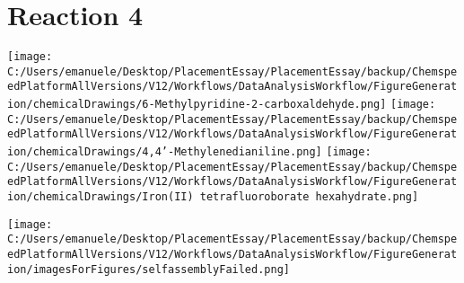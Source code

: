 \documentclass{article}%
\begin{document}
\section*{Reaction 4}%
%
\begin{scheme}[H]%
\begin{minipage}{0.5\textwidth}%
\texttt{[image: C:/Users/emanuele/Desktop/PlacementEssay/PlacementEssay/backup/ChemspeedPlatformAllVersions/V12/Workflows/DataAnalysisWorkflow/FigureGeneration/chemicalDrawings/6-Methylpyridine-2-carboxaldehyde.png]}%
\texttt{[image: C:/Users/emanuele/Desktop/PlacementEssay/PlacementEssay/backup/ChemspeedPlatformAllVersions/V12/Workflows/DataAnalysisWorkflow/FigureGeneration/chemicalDrawings/4,4'-Methylenedianiline.png]}%
\texttt{[image: C:/Users/emanuele/Desktop/PlacementEssay/PlacementEssay/backup/ChemspeedPlatformAllVersions/V12/Workflows/DataAnalysisWorkflow/FigureGeneration/chemicalDrawings/Iron(II) tetrafluoroborate hexahydrate.png]}%
\end{minipage}%
\begin{minipage}{0.5\textwidth}%
\begin{center}%
\texttt{[image: C:/Users/emanuele/Desktop/PlacementEssay/PlacementEssay/backup/ChemspeedPlatformAllVersions/V12/Workflows/DataAnalysisWorkflow/FigureGeneration/imagesForFigures/selfassemblyFailed.png]}%
\end{center}%
\end{minipage}%
\caption{Self-assembly of components 8, 17, with Iron(II) in a 3.0:1.5:1.0 molar ratio in CH$_3$CN at 60\textdegree C for 40h. These are the reagents (starting materials) for reaction 4.}%
\end{scheme}%
\end{document}
